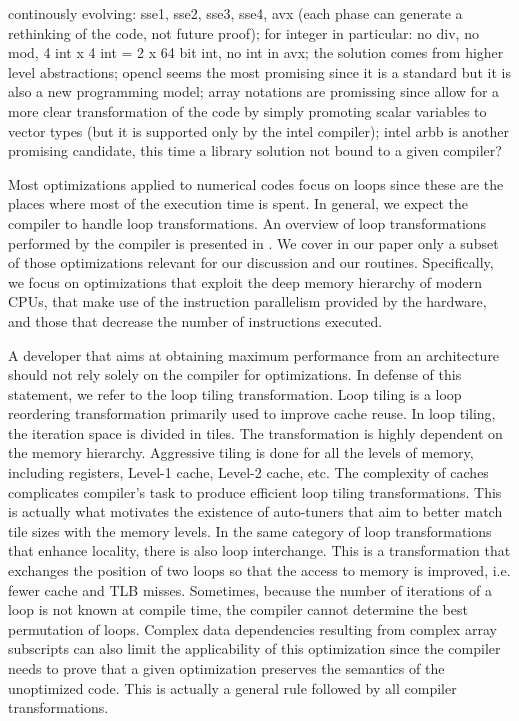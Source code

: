 continously evolving: sse1, sse2, sse3, sse4, avx (each phase can generate a rethinking of the code, not future proof); for integer in particular: no div, no mod, 4 int x 4 int = 2 x 64 bit int, no int in avx; the solution comes from higher level abstractions; opencl seems the most promising since it is a standard but it is also a new programming model; array notations are promissing since allow for a more clear transformation of the code by simply promoting scalar variables to vector types (but it is supported only by the intel compiler); intel arbb is another promising candidate, this time a library solution not bound to a given compiler? 

Most optimizations applied to numerical codes focus on loops since these are the places where most of the execution time is spent. In general, we expect the compiler to handle loop transformations. An overview of loop transformations performed by the compiler is presented in \cite{bacon1994}. We cover in our paper only a subset of those optimizations relevant for our discussion and our routines. Specifically, we focus on optimizations that exploit the deep memory hierarchy of modern CPUs, that make use of the instruction parallelism provided by the hardware, and those that decrease the number of instructions executed.

A developer that aims at obtaining maximum performance from an architecture should not rely solely on the compiler for optimizations. In defense of this statement, we refer to the loop tiling transformation. Loop tiling is a loop reordering transformation primarily used to improve cache reuse. In loop tiling, the iteration space is divided in tiles. The transformation is highly dependent on the memory hierarchy. Aggressive tiling is done for all the levels of memory, including registers, Level-1 cache, Level-2 cache, etc. The complexity of caches complicates compiler's task to produce efficient loop tiling transformations. This is actually what motivates the existence of auto-tuners that aim to better match tile sizes with the memory levels. In the same category of loop transformations that enhance locality, there is also loop interchange. This is a transformation that exchanges the position of two loops so that the access to memory is improved, i.e. fewer cache and TLB misses. Sometimes, because the number of iterations of a loop is not known at compile time, the compiler cannot determine the best permutation of loops. Complex data dependencies resulting from complex array subscripts can also limit the applicability of this optimization since the compiler needs to prove that a given optimization preserves the semantics of the unoptimized code. This is actually a general rule followed by all compiler transformations.

